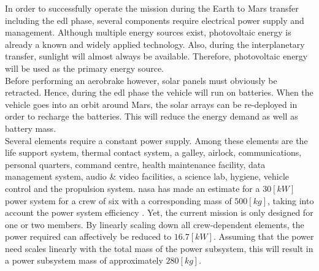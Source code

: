 In order to successfully operate the mission during the Earth to Mars transfer including the \gls{edl} phase, several components require electrical power supply and management. Although multiple  energy sources exist, photovoltaic energy is already a known and widely applied technology. Also, during the interplanetary transfer, sunlight will almost always be available. Therefore, photovoltaic energy will be used as the primary energy source.\\
 
Before performing an aerobrake however, solar panels must obviously be retracted. Hence, during the \gls{edl} phase the vehicle will run on batteries. When the vehicle goes into an orbit around Mars, the solar arrays can be re-deployed in order to recharge the batteries. This will reduce the energy demand as well as battery mass.\\

Several elements require a constant power supply. Among these elements are the life support system, thermal contact system, a galley, airlock, communications, personal quarters, command centre, health maintenance facility, data management system, audio \& video facilities, a science lab, hygiene, vehicle control and the propulsion system. \gls{nasa} has made an estimate for a $30 \left[kW\right]$ power system for a crew of six with a corresponding mass of $500 \left[kg\right]$, taking into account the power system efficiency \cite{Hoffman1997a}. Yet, the current mission is only designed for one or two members. By linearly scaling down all crew-dependent elements, the power required can affectively be reduced to $16.7 \left[kW\right]$. Assuming that the power need scales linearly with the total mass of the power subsystem, this will result in a power subsystem mass of approximately $280 \left[kg\right]$.\\
